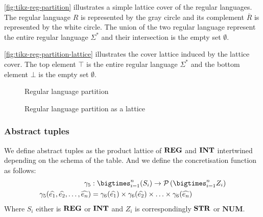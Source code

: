 
\begin{example}
    \autoref{fig:tikz-reg-partition} illustrates a simple lattice cover of the regular languages.
    The regular language $R$ is represented by the gray circle and its complement $\overline{R}$ is represented by the white circle.
    The union of the two regular language represent the entire regular language $\Sigma^*$ and their intersection is the empty set $\emptyset$.

    \autoref{fig:tikz-reg-partition-lattice} illustrates the cover lattice induced by the lattice cover.
    The top element $\top$ is the entire regular language $\Sigma^*$ and the bottom element $\bot$ is the empty set $\emptyset$.
\end{example}

\begin{figure}
    \center
    \resizebox{7.5cm}{!}{
    }
    \caption{Regular language partition}
    \label{fig:tikz-reg-partition}
\end{figure}

\begin{figure}[!htb]
    \center
    \resizebox{6.5cm}{!}{
    }
    \caption{Regular language partition as a lattice}
    \label{fig:tikz-reg-partition-lattice}
\end{figure}

\subsubsection{Abstract tuples}

We define abstract tuples as the product lattice of $\mathbf{REG}$ and $\mathbf{INT}$ intertwined depending on the schema of the table.
And we define the concretisation function as follows:
\begin{align}
    \concrete_5 &: \bigtimes_{i = 1}^{n}(S_i) \rightarrow \mathcal{P}\left(\bigtimes_{i = 1}^n Z_i \right) \\
    \concrete_5(\ab{e_1}, \ab{e_2}, \dots, \ab{e_n}) &= \concrete_6(\ab{e_1}) \times \concrete_6(\ab{e_2}) \times \dots \times \concrete_6(\ab{e_n})
\end{align}
Where $S_i$ either is $\mathbf{REG}$ or $\mathbf{INT}$ and $Z_i$ is correspondingly $\mathbf{STR}$ or $\mathbf{NUM}$.

